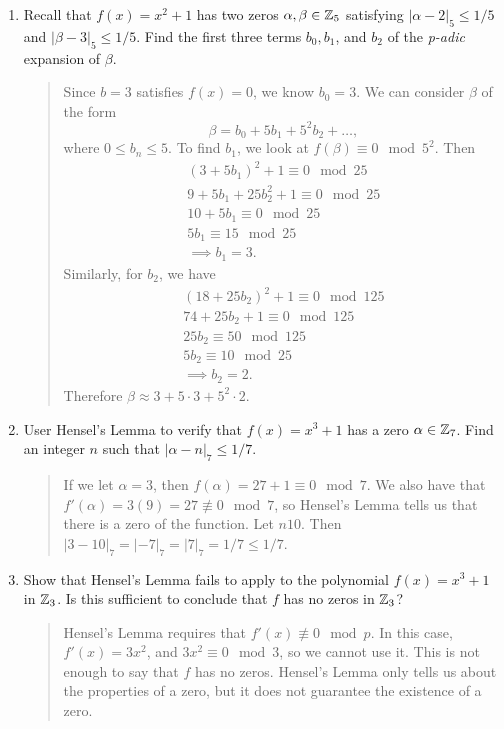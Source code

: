 \documentclass{hw}
\begin{document}

\begin{enumerate}
    \item Recall that $f(x)=x^2 + 1$ has two zeros $\alpha,\beta\in\mathbb{Z}_{5}$ satisfying $|\alpha-2|_{5}\leq 1/5$ and
    $|\beta-3|_{5}\leq 1/5$. Find the first three terms $b_{0}, b_{1}$, and $b_{2}$ of the \textit{p-adic} expansion
    of $\beta$.
    \begin{quote}
        Since $b=3$ satisfies $f(x)=0$, we know $b_{0}=3$. We can consider $\beta$ of the form
        \[
            \beta = b_{0} + 5b_{1} + 5^{2}b_{2} + \dots,
        \]
        where $0\leq b_{n} \leq 5$. To find $b_{1}$, we look at $f(\beta)\equiv 0\mod 5^{2}$. Then
        \begin{gather*}
            (3+5b_{1})^{2} + 1 \equiv 0\mod 25\\
            9 + 5b_{1} + 25b_{2}^{2} + 1 \equiv 0\mod 25\\
            10 + 5b_{1} \equiv 0\mod 25\\
            5b_{1}\equiv 15\mod 25\\
            \implies b_{1}=3.
        \end{gather*}
        Similarly, for $b_{2}$, we have
        \begin{gather*}
            (18+25b_{2})^{2} + 1 \equiv 0\mod 125\\
            74 + 25b_{2} + 1 \equiv 0 \mod 125\\
            25b_{2} \equiv 50\mod 125\\
            5b_{2}\equiv 10\mod 25\\
            \implies b_{2} = 2.
        \end{gather*}
        Therefore $\beta \approx 3 + 5\cdot3 + 5^{2}\cdot2$.
    \end{quote}

    \item User Hensel's Lemma to verify that $f(x)=x^3+1$ has a zero $\alpha\in\mathbb{Z}_{7}$. Find an integer $n$ such that
    $|\alpha-n|_{7} \leq 1/7$.
    \begin{quote}
        If we let $\alpha=3$, then $f(\alpha)=27+1\equiv 0\mod 7$. We also have that
        $f'(\alpha)=3(9)=27\not\equiv0\mod7$, so Hensel's Lemma tells us that there is a zero of the function. Let $n  10$. Then $|3-10|_{7}=|-7|_{7}=|7|_{7}=1/7 \leq 1/7$.
    \end{quote}

    \item Show that Hensel's Lemma fails to apply to the polynomial $f(x)=x^3+1$ in $\mathbb{Z}_{3}$. Is this sufficient to
    conclude that $f$ has no zeros in $\mathbb{Z}_{3}$?
    \begin{quote}
        Hensel's Lemma requires that $f'(x)\not\equiv 0 \mod p$. In this case, $f'(x)=3x^{2}$, and
        $3x^{2}\equiv0\mod 3$, so we cannot use it. This is not enough to say that $f$ has no zeros. Hensel's Lemma only tells us about the properties of a zero, but it does not guarantee the existence of a zero.
    \end{quote}
\end{enumerate}
\end{document}
